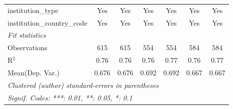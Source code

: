 \begin{tabular}{lcccccc}
   institution\_type                  & Yes     & Yes           & Yes     & Yes     & Yes     & Yes\\  
   institution\_country\_code         & Yes     & Yes           & Yes     & Yes     & Yes     & Yes\\  
   \midrule
   \emph{Fit statistics}\\
   Observations                       & 615     & 615           & 554     & 554     & 584     & 584\\  
   R$^2$                              & 0.76    & 0.76          & 0.76    & 0.77    & 0.76    & 0.77\\  
Mean(Dep. Var.) & 0.676 & 0.676 & 0.692 & 0.692 & 0.667 & 0.667 \\
   \midrule \midrule
   \multicolumn{7}{l}{\emph{Clustered (author) standard-errors in parentheses}}\\
   \multicolumn{7}{l}{\emph{Signif. Codes: ***: 0.01, **: 0.05, *: 0.1}}\\
\end{tabular}
\par\endgroup
